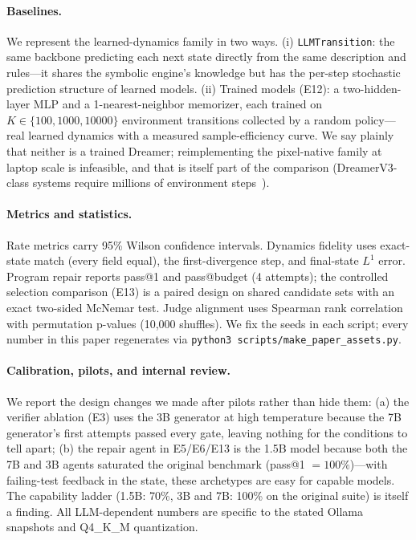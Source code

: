 \documentclass[11pt]{article}
\begin{document}
\paragraph{Baselines.} We represent the learned-dynamics family in two ways.
(i) \texttt{LLMTransition}: the same backbone predicting each next state
directly from the same description and rules---it shares the symbolic engine's
knowledge but has the per-step stochastic prediction structure of
learned models. (ii) Trained models (E12): a two-hidden-layer
MLP and a 1-nearest-neighbor memorizer, each trained on $K \in \{100, 1000,
10000\}$ environment transitions collected by a random policy---real learned
dynamics with a measured sample-efficiency curve. We say plainly that
neither is a trained Dreamer; reimplementing the
pixel-native family at laptop scale is infeasible, and that is itself part of the comparison
(DreamerV3-class systems require millions of environment
steps~\cite{dreamerv3}).

\paragraph{Metrics and statistics.} Rate metrics carry 95\% Wilson confidence
intervals. Dynamics fidelity uses exact-state match (every field equal),
the first-divergence step, and final-state $L^1$ error. Program repair reports
pass@1 and pass@budget (4 attempts); the controlled selection comparison
(E13) is a paired design on shared candidate sets with an exact two-sided
McNemar test. Judge alignment uses Spearman rank correlation with permutation
p-values (10{,}000 shuffles). We fix the seeds in each script; every number in
this paper regenerates via \texttt{python3 scripts/make\_paper\_assets.py}.

\paragraph{Calibration, pilots, and internal review.} We report the design
changes we made after pilots rather than hide them: (a) the verifier ablation (E3)
uses the 3B generator at high temperature because the 7B generator's first
attempts passed every gate, leaving nothing for the conditions to tell apart;
(b) the repair agent in E5/E6/E13 is the 1.5B model because both the 7B and
3B agents saturated the original benchmark (pass@1 $=100\%$)---with
failing-test feedback in the state, these archetypes are easy for capable
models. The capability ladder (1.5B: 70\%, 3B and 7B: 100\% on the original
suite) is itself a finding. All LLM-dependent numbers are
specific to the stated Ollama snapshots and Q4\_K\_M quantization.
\end{document}
